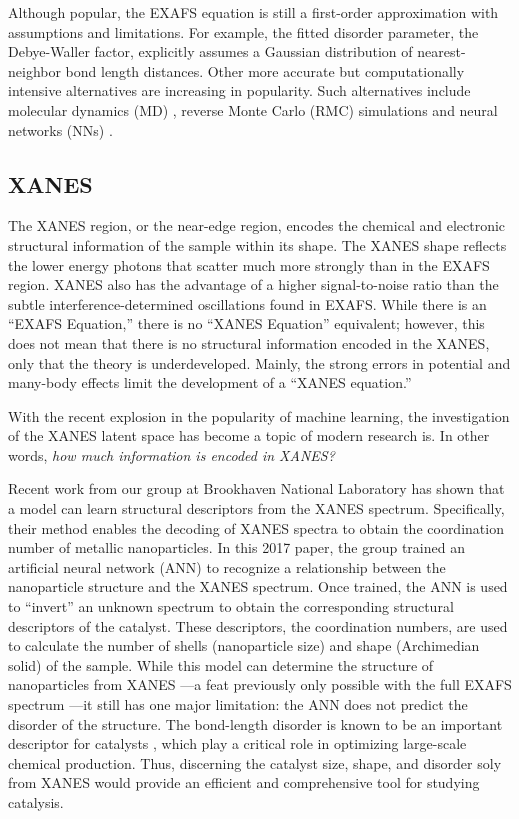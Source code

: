 Although popular, the EXAFS equation is still a first-order approximation with assumptions and limitations. For example, the fitted disorder parameter, the Debye-Waller factor, explicitly assumes a Gaussian distribution of nearest-neighbor bond length distances. Other more accurate but computationally intensive alternatives are increasing in popularity. Such alternatives include molecular dynamics (MD) \cite{mol-dyn-xanes}, reverse Monte Carlo (RMC) simulations  \cite{RMC-xanes} and neural networks (NNs) \cite{lin2020machine} \cite{timoshenko2018neural}.

\subsection{XANES}
The XANES region, or the near-edge region, encodes the chemical and electronic structural information of the sample within its shape. The XANES shape reflects the lower energy photons that scatter much more strongly than in the EXAFS region. XANES also has the advantage of a higher signal-to-noise ratio than the subtle interference-determined oscillations found in EXAFS. While there is an ``EXAFS Equation,'' there is no ``XANES Equation'' equivalent; however, this does not mean that there is no structural information encoded in the XANES, only that the theory is underdeveloped. Mainly, the strong errors in potential and many-body effects limit the development of a ``XANES equation.'' 

With the recent explosion in the popularity of machine learning, the investigation of the XANES latent space has become a topic of modern research is. In other words, \textit{how much information is encoded in XANES?}

Recent work from our group at Brookhaven National Laboratory \cite{Timoshenko2017} has shown that a model can learn structural descriptors from the XANES spectrum. Specifically, their method enables the decoding of XANES spectra to obtain the coordination number of metallic nanoparticles. In this 2017 paper, the group trained an artificial neural network (ANN) to recognize a relationship between the nanoparticle structure and the XANES spectrum. Once trained, the ANN is used to ``invert'' an unknown spectrum to obtain the corresponding structural descriptors of the catalyst. These descriptors, the coordination numbers, are used to calculate the number of shells (nanoparticle size) and shape (Archimedian solid) of the sample. While this model can determine the structure of nanoparticles from XANES ---a feat previously only possible with the full EXAFS spectrum ---it still has one major limitation: the ANN does not predict the disorder of the structure. The bond-length disorder is known to be an important descriptor for catalysts \cite{catalyst-strain-dependence} \cite{co-strain-effects}, which play a critical role in optimizing large-scale chemical production. Thus, discerning the catalyst size, shape, and disorder soly from XANES would provide an efficient and comprehensive tool for studying catalysis.

